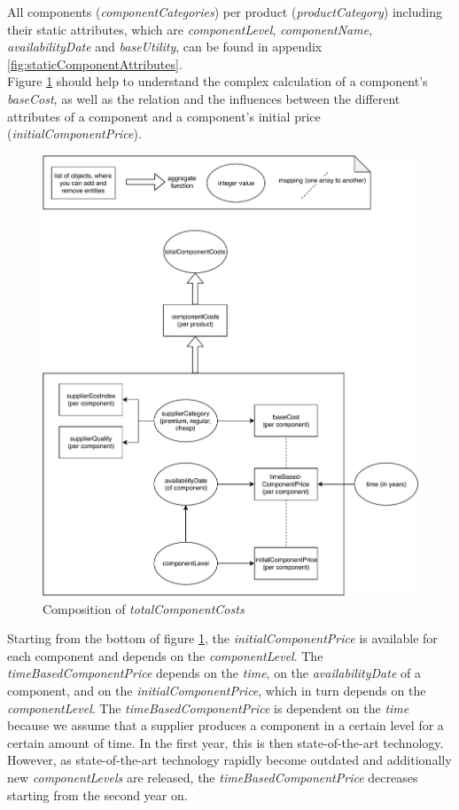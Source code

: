 All components (\textit{componentCategories}) per product (\textit{productCategory}) including their static attributes, which are \textit{componentLevel}, \textit{componentName}, \textit{availabilityDate} and \textit{baseUtility}, can be found in appendix \ref{fig:staticComponentAttributes}.\\
Figure \ref{img:totalComponentCosts} should help to understand the complex calculation of a component's \textit{baseCost}, as well as the relation and the influences between the different attributes of a component and a component’s initial price (\textit{initialComponentPrice}).

\begin{figure} [H]
	\centering
	\includegraphics[width=11.5cm]{images/totalComponentCosts.pdf}
	\caption{Composition of \textit{totalComponentCosts}}
	\label{img:totalComponentCosts}
\end{figure}

Starting from the bottom of figure \ref{img:totalComponentCosts}, the \textit{initialComponentPrice} is available for each component and depends on the \textit{componentLevel}.
The \textit{timeBasedComponentPrice} depends on the \textit{time}, on the \textit{availabilityDate} of a component, and on the \textit{initialComponentPrice}, which in turn depends on the \textit{componentLevel}.
The \textit{timeBasedComponentPrice} is dependent on the \textit{time} because we assume that a supplier produces a component in a certain level for a certain amount of time. In the first year, this is then state-of-the-art technology. However, as state-of-the-art technology rapidly become outdated and additionally new \textit{componentLevels} are released, the \textit{timeBasedComponentPrice} decreases starting from the second year on.

